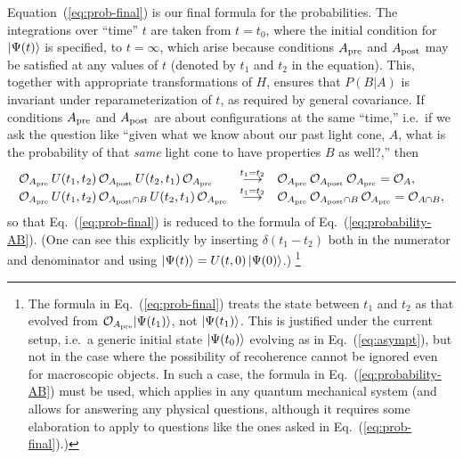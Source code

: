 \documentclass[12pt]{article}
\begin{document}
Equation~(\ref{eq:prob-final}) is our final formula for the probabilities. 
The integrations over ``time'' $t$ are taken from $t = t_0$, where the 
initial condition for $\left| \Psi(t) \right>$ is specified, to $t = \infty$, which 
arise because conditions $A_{\rm pre}$ and $A_{\rm post}$ may be satisfied 
at any values of $t$ (denoted by $t_1$ and $t_2$ in the equation).  This, 
together with appropriate transformations of $H$, ensures that $P(B|A)$ 
is invariant under reparameterization of $t$, as required by general 
covariance.  If conditions $A_{\rm pre}$ and $A_{\rm post}$ are about 
configurations at the same ``time,'' i.e.\ if we ask the question 
like ``given what we know about our past light cone, $A$, what is the 
probability of that {\it same} light cone to have properties $B$ as 
well?,'' then
%
\begin{equation}
\begin{array}{lcl}
  {\cal O}_{A_{\rm pre}}\, U(t_1,t_2) \,{\cal O}_{A_{\rm post}}\, 
    U(t_2,t_1) \,{\cal O}_{A_{\rm pre}} 
  & \stackrel{t_1=t_2}{\longrightarrow} &
  {\cal O}_{A_{\rm pre}}\, {\cal O}_{A_{\rm post}}\, 
    {\cal O}_{A_{\rm pre}} = {\cal O}_A,
\\
  {\cal O}_{A_{\rm pre}}\, U(t_1,t_2) \,{\cal O}_{A_{\rm post} \cap B}\, 
    U(t_2,t_1) \,{\cal O}_{A_{\rm pre}} 
  & \stackrel{t_1=t_2}{\longrightarrow} &
  {\cal O}_{A_{\rm pre}}\, {\cal O}_{A_{\rm post} \cap B}\, 
    {\cal O}_{A_{\rm pre}} = {\cal O}_{A \cap B},
\end{array}
\label{eq:t_1=t_2}
\end{equation}
%
so that Eq.~(\ref{eq:prob-final}) is reduced to the formula of 
Eq.~(\ref{eq:probability-AB}).  (One can see this explicitly by inserting 
$\delta(t_1-t_2)$ both in the numerator and denominator and using 
$\left| \Psi(t) \right> = U(t,0) \left| \Psi(0) \right>$.)%
\footnote{The formula in Eq.~(\ref{eq:prob-final}) treats the state 
 between $t_1$ and $t_2$ as that evolved from ${\cal O}_{A_{\rm pre}}\! 
 \ket{\Psi(t_1)}$, not $\left| \Psi(t_1) \right>$.  This is justified under the 
 current setup, i.e.\ a generic initial state $\left| \Psi(t_0) \right>$ evolving 
 as in Eq.~(\ref{eq:asympt}), but not in the case where the possibility 
 of recoherence cannot be ignored even for macroscopic objects.  In such 
 a case, the formula in Eq.~(\ref{eq:probability-AB}) must be used, which 
 applies in any quantum mechanical system (and allows for answering any 
 physical questions, although it requires some elaboration to apply to 
 questions like the ones asked in Eq.~(\ref{eq:prob-final}).)}
\end{document}

